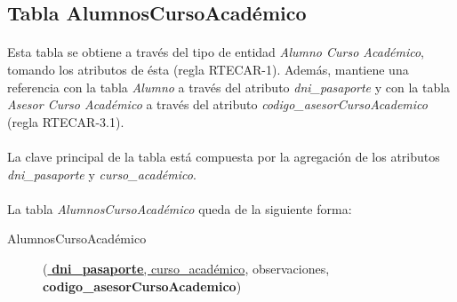    \subsection{Tabla AlumnosCursoAcadémico}

      \paragraph{}Esta tabla se obtiene a través del tipo de entidad
      \textit{Alumno Curso Académico}, tomando los atributos de ésta (regla
      RTECAR-1). Además, mantiene una referencia con la tabla \textit{Alumno} a
      través del atributo \textit{dni\_pasaporte} y con la
      tabla \textit{Asesor Curso Académico} a través del atributo
      \textit{codigo\_asesorCursoAcademico} (regla RTECAR-3.1).

      \paragraph{}La clave principal de la tabla está compuesta por la
      agregación de los atributos \textit{dni\_pasaporte} y
      \textit{curso\_académico}.

      \paragraph{}La tabla \textit{AlumnosCursoAcadémico} queda de la siguiente
      forma:

      \begin{description}
         \item[AlumnosCursoAcadémico] \begin{flushleft}(\underline{
         \textbf{dni\_pasaporte}, curso\_académico}, observaciones,
         \textbf{codigo\_asesorCursoAcademico})\end{flushleft}
      \end{description}
